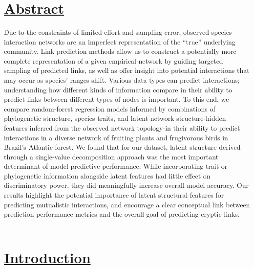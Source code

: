 
\section*{\textbf{\underline{Abstract}}}

\paragraph*{}
Due to the constraints of limited effort and sampling error, observed species interaction networks are an imperfect representation of the ``true'' underlying community. Link prediction methods allow us to construct a potentially more complete representation of a given empirical network by guiding targeted sampling of predicted links, as well as offer insight into potential interactions that may occur as species' ranges shift. Various data types can predict interactions; understanding how different kinds of information compare in their ability to predict links between different types of nodes is important. To this end, we compare random-forest regression models informed by combinations of phylogenetic structure, species traits, and latent network structure-hidden features inferred from the observed network topology-in their ability to predict interactions in a diverse network of fruiting plants and frugivorous birds in Brazil's Atlantic forest. We found that for our dataset, latent structure derived through a single-value decomposition approach was the most important determinant of model predictive performance. While incorporating trait or phylogenetic information alongside latent features had little effect on discriminatory power, they did meaningfully increase overall model accuracy. Our results highlight the potential importance of latent structural features for predicting mutualistic interactions, and encourage a clear conceptual link between prediction performance metrics and the overall goal of predicting cryptic links. \\
\\


\clearpage 

\section*{\textbf{\underline{Introduction}}}

